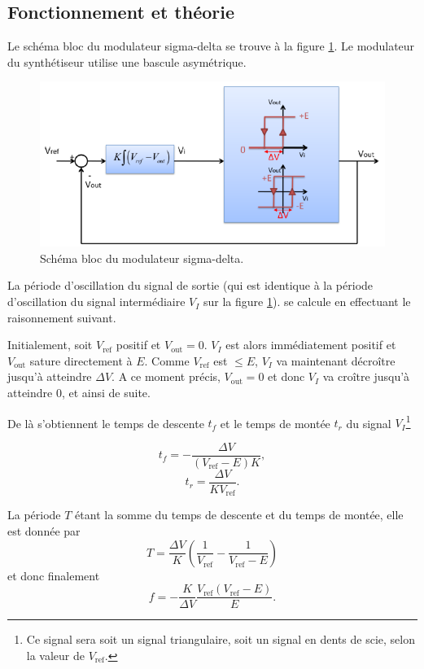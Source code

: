 

\subsection{Fonctionnement et théorie}
Le schéma bloc du modulateur sigma-delta se trouve
à la figure \ref{fig:sigma-delta-schema-blocs}. Le
modulateur du synthétiseur utilise une bascule asymétrique.

\begin{figure}[ht]
	\centering
	\includegraphics[scale=0.75]{img-sigma-delta/schema-blocs.png}
	\caption{Schéma bloc du modulateur sigma-delta.}
	\label{fig:sigma-delta-schema-blocs}
\end{figure}

La période d'oscillation du signal de sortie (qui est 
identique à la période d'oscillation du signal intermédiaire
$V_I$ sur la figure \ref{fig:sigma-delta-schema-blocs}).
se calcule en effectuant le raisonnement suivant.

Initialement, soit $V_{\text{ref}}$  positif et
$V_{\text{out}} = 0$. $V_I$ est alors immédiatement positif
et $V_{\text{out}}$ sature directement à $E$. Comme $V_{\text{ref}}$
est $\leq E$, $V_I$ va maintenant décroître jusqu'à atteindre
$\Delta V$. A ce moment précis, $V_{\text{out}} = 0$
et donc $V_I$ va croître jusqu'à atteindre 0, et ainsi de suite.

De là s'obtiennent le temps de descente $t_f$ et le temps de montée $t_r$
du signal $V_I$\footnote{Ce signal sera soit un signal triangulaire,
soit un signal en dents de scie, selon la valeur de $V_{\text{ref}}$.}

\[ t_f = -\frac{\Delta V}{(V_{\text{ref}} - E)K},\]
\[ t_r = \frac{\Delta V}{KV_{\text{ref}}}.\]

La période $T$ étant la somme du temps de descente et du temps
de montée, elle est donnée par
\[ T = \frac{\Delta V}{K}\left(\frac{1}{V_{\text{ref}}} - \frac{1}{V_{\text{ref}} - E}\right) \]
et donc finalement
\begin{equation} 
	f = -\frac{K}{\Delta V} \frac{V_{\text{ref}}(V_{\text{ref}}-E)}{E}.
	\label{eq:sigma-delta-frequency}
\end{equation}

